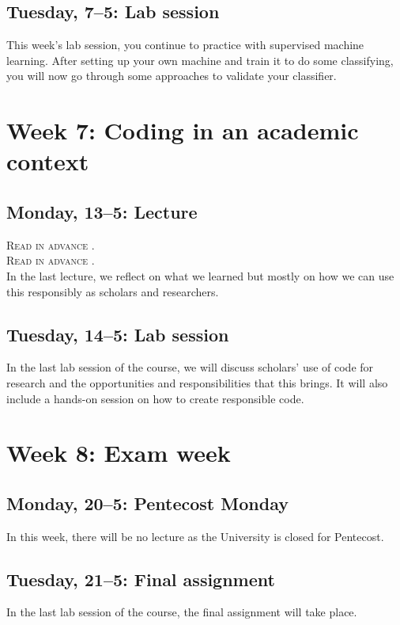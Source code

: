 \subsection*{Tuesday, 7--5: Lab session}
This week's lab session, you continue to practice with supervised machine learning. After setting up your own machine and train it to do some classifying, you will now go through some approaches to validate your classifier.

\section*{Week 7: Coding in an academic context}

\subsection*{Monday, 13--5: Lecture}
\textsc{ Read in advance \cite{hube_understanding_2019}.} \\
\textsc{ Read in advance \cite{bender_dangers_2021}.} \\

In the last lecture, we reflect on what we learned but mostly on how we can use this responsibly as scholars and researchers. 

\subsection*{Tuesday, 14--5: Lab session}
In the last lab session of the course, we will discuss scholars' use of code for research and the opportunities and responsibilities that this brings. It will also include a hands-on session on how to create responsible code.

\section*{Week 8: Exam week}

\subsection*{Monday, 20--5: Pentecost Monday}
In this week, there will be no lecture as the University is closed for Pentecost.

\subsection*{Tuesday, 21--5: Final assignment}
In the last lab session of the course, the final assignment will take place. 









